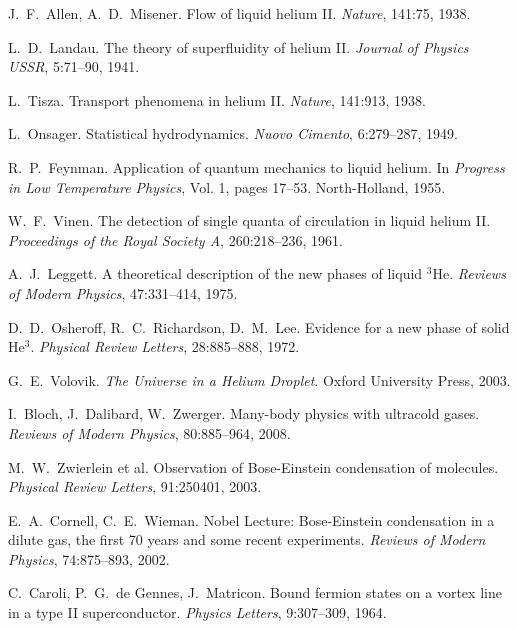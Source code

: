 \documentclass[12pt,a4paper]{article}
\theoremstyle{definition}
\theoremstyle{remark}
\begin{document}
\begin{thebibliography}{99}
J.~F.~Allen, A.~D.~Misener.
\newblock Flow of liquid helium II.
\newblock \emph{Nature}, 141:75, 1938.

L.~D.~Landau.
\newblock The theory of superfluidity of helium II.
\newblock \emph{Journal of Physics USSR}, 5:71--90, 1941.

L.~Tisza.
\newblock Transport phenomena in helium II.
\newblock \emph{Nature}, 141:913, 1938.

L.~Onsager.
\newblock Statistical hydrodynamics.
\newblock \emph{Nuovo Cimento}, 6:279--287, 1949.

R.~P.~Feynman.
\newblock Application of quantum mechanics to liquid helium.
\newblock In \emph{Progress in Low Temperature Physics}, Vol. 1, pages 17--53. North-Holland, 1955.

W.~F.~Vinen.
\newblock The detection of single quanta of circulation in liquid helium II.
\newblock \emph{Proceedings of the Royal Society A}, 260:218--236, 1961.

A.~J.~Leggett.
\newblock A theoretical description of the new phases of liquid $^3$He.
\newblock \emph{Reviews of Modern Physics}, 47:331--414, 1975.

D.~D.~Osheroff, R.~C.~Richardson, D.~M.~Lee.
\newblock Evidence for a new phase of solid He$^3$.
\newblock \emph{Physical Review Letters}, 28:885--888, 1972.

G.~E.~Volovik.
\newblock \emph{The Universe in a Helium Droplet}.
\newblock Oxford University Press, 2003.

I.~Bloch, J.~Dalibard, W.~Zwerger.
\newblock Many-body physics with ultracold gases.
\newblock \emph{Reviews of Modern Physics}, 80:885--964, 2008.

M.~W.~Zwierlein et al.
\newblock Observation of Bose-Einstein condensation of molecules.
\newblock \emph{Physical Review Letters}, 91:250401, 2003.

E.~A.~Cornell, C.~E.~Wieman.
\newblock Nobel Lecture: Bose-Einstein condensation in a dilute gas, the first 70 years and some recent experiments.
\newblock \emph{Reviews of Modern Physics}, 74:875--893, 2002.

C.~Caroli, P.~G.~de Gennes, J.~Matricon.
\newblock Bound fermion states on a vortex line in a type II superconductor.
\newblock \emph{Physics Letters}, 9:307--309, 1964.


\end{thebibliography}
\end{document}
